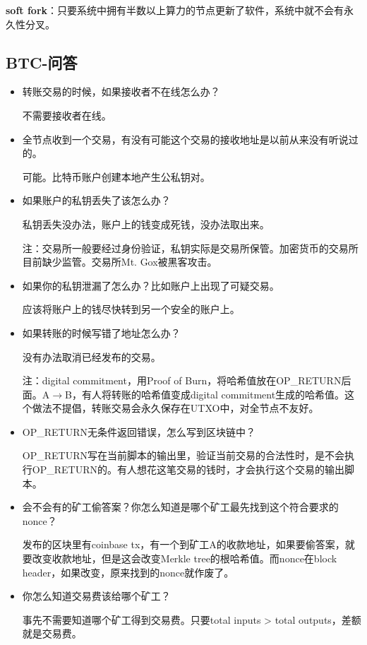 \documentclass[10pt]{ctexart}
\begin{document}
\textbf{soft fork}：只要系统中拥有半数以上算力的节点更新了软件，系统中就不会有永久性分叉。

\subsection{BTC-问答}
\begin{itemize}
    \item 转账交易的时候，如果接收者不在线怎么办？
        
    不需要接收者在线。
    \item 全节点收到一个交易，有没有可能这个交易的接收地址是以前从来没有听说过的。
    
    可能。比特币账户创建本地产生公私钥对。
    \item 如果账户的私钥丢失了该怎么办？
    
    私钥丢失没办法，账户上的钱变成死钱，没办法取出来。

    注：交易所一般要经过身份验证，私钥实际是交易所保管。加密货币的交易所目前缺少监管。交易所Mt. Gox被黑客攻击。
    \item 如果你的私钥泄漏了怎么办？比如账户上出现了可疑交易。
    
    应该将账户上的钱尽快转到另一个安全的账户上。

    \item 如果转账的时候写错了地址怎么办？
    
    没有办法取消已经发布的交易。

    注：digital commitment，用Proof of Burn，将哈希值放在OP\_RETURN后面。A$\rightarrow$B，有人将转账的哈希值变成digital commitment生成的哈希值。这个做法不提倡，转账交易会永久保存在UTXO中，对全节点不友好。

    \item OP\_RETURN无条件返回错误，怎么写到区块链中？
    
    OP\_RETURN写在当前脚本的输出里，验证当前交易的合法性时，是不会执行OP\_RETURN的。有人想花这笔交易的钱时，才会执行这个交易的输出脚本。

    \item 会不会有的矿工偷答案？你怎么知道是哪个矿工最先找到这个符合要求的nonce？
    
    发布的区块里有coinbase tx，有一个到矿工A的收款地址，如果要偷答案，就要改变收款地址，但是这会改变Merkle tree的根哈希值。而nonce在block header，如果改变，原来找到的nonce就作废了。

    \item 你怎么知道交易费该给哪个矿工？
    
    事先不需要知道哪个矿工得到交易费。只要total inputs > total outputs，差额就是交易费。
\end{itemize}
 
\end{document}
